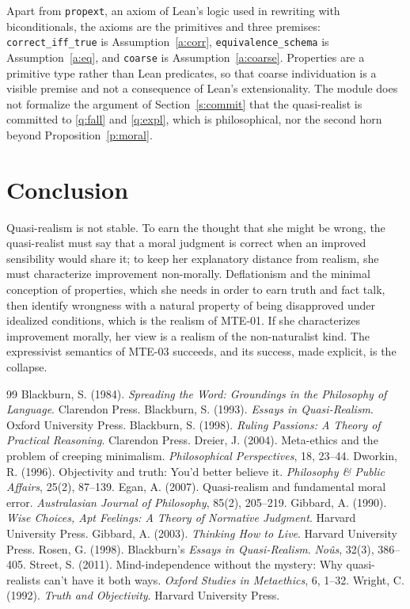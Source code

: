 \documentclass{situationist-preprint}
\begin{document}
Apart from \texttt{propext}, an axiom of Lean's logic used in rewriting with biconditionals, the axioms are the primitives and three premises: \texttt{correct\_iff\_true} is Assumption~\ref{a:corr}, \texttt{equivalence\_schema} is Assumption~\ref{a:eq}, and \texttt{coarse} is Assumption~\ref{a:coarse}. Properties are a primitive type rather than Lean predicates, so that coarse individuation is a visible premise and not a consequence of Lean's extensionality. The module does not formalize the argument of Section~\ref{s:commit} that the quasi-realist is committed to \ref{q:fall} and \ref{q:expl}, which is philosophical, nor the second horn beyond Proposition~\ref{p:moral}.

\section{Conclusion}

Quasi-realism is not stable. To earn the thought that she might be wrong, the quasi-realist must say that a moral judgment is correct when an improved sensibility would share it; to keep her explanatory distance from realism, she must characterize improvement non-morally. Deflationism and the minimal conception of properties, which she needs in order to earn truth and fact talk, then identify wrongness with a natural property of being disapproved under idealized conditions, which is the realism of MTE-01. If she characterizes improvement morally, her view is a realism of the non-naturalist kind. The expressivist semantics of MTE-03 succeeds, and its success, made explicit, is the collapse.

\begin{thebibliography}{99}\small
{} Blackburn, S. (1984). \emph{Spreading the Word: Groundings in the Philosophy of Language}. Clarendon Press.
 Blackburn, S. (1993). \emph{Essays in Quasi-Realism}. Oxford University Press.
 Blackburn, S. (1998). \emph{Ruling Passions: A Theory of Practical Reasoning}. Clarendon Press.
 Dreier, J. (2004). Meta-ethics and the problem of creeping minimalism. \emph{Philosophical Perspectives}, 18, 23--44.
 Dworkin, R. (1996). Objectivity and truth: You'd better believe it. \emph{Philosophy \& Public Affairs}, 25(2), 87--139.
 Egan, A. (2007). Quasi-realism and fundamental moral error. \emph{Australasian Journal of Philosophy}, 85(2), 205--219.
 Gibbard, A. (1990). \emph{Wise Choices, Apt Feelings: A Theory of Normative Judgment}. Harvard University Press.
 Gibbard, A. (2003). \emph{Thinking How to Live}. Harvard University Press.
 Rosen, G. (1998). Blackburn's \emph{Essays in Quasi-Realism}. \emph{No\^us}, 32(3), 386--405.
 Street, S. (2011). Mind-independence without the mystery: Why quasi-realists can't have it both ways. \emph{Oxford Studies in Metaethics}, 6, 1--32.
 Wright, C. (1992). \emph{Truth and Objectivity}. Harvard University Press.
\end{thebibliography}
\end{document}
